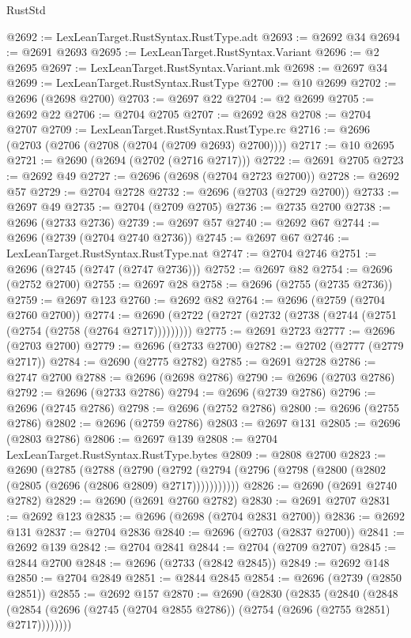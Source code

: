 \begin{lexlean}{RustStd}
\begin{coremodule}
@2692 := LexLeanTarget.RustSyntax.RustType.adt
@2693 := @2692 @34
@2694 := @2691 @2693
@2695 := LexLeanTarget.RustSyntax.Variant
@2696 := @2 @2695
@2697 := LexLeanTarget.RustSyntax.Variant.mk
@2698 := @2697 @34
@2699 := LexLeanTarget.RustSyntax.RustType
@2700 := @10 @2699
@2702 := @2696 (@2698 @2700)
@2703 := @2697 @22
@2704 := @2 @2699
@2705 := @2692 @22
@2706 := @2704 @2705
@2707 := @2692 @28
@2708 := @2704 @2707
@2709 := LexLeanTarget.RustSyntax.RustType.rc
@2716 := @2696 (@2703 (@2706 (@2708 (@2704 (@2709 @2693) @2700))))
@2717 := @10 @2695
@2721 := @2690 (@2694 (@2702 (@2716 @2717)))
@2722 := @2691 @2705
@2723 := @2692 @49
@2727 := @2696 (@2698 (@2704 @2723 @2700))
@2728 := @2692 @57
@2729 := @2704 @2728
@2732 := @2696 (@2703 (@2729 @2700))
@2733 := @2697 @49
@2735 := @2704 (@2709 @2705)
@2736 := @2735 @2700
@2738 := @2696 (@2733 @2736)
@2739 := @2697 @57
@2740 := @2692 @67
@2744 := @2696 (@2739 (@2704 @2740 @2736))
@2745 := @2697 @67
@2746 := LexLeanTarget.RustSyntax.RustType.nat
@2747 := @2704 @2746
@2751 := @2696 (@2745 (@2747 (@2747 @2736)))
@2752 := @2697 @82
@2754 := @2696 (@2752 @2700)
@2755 := @2697 @28
@2758 := @2696 (@2755 (@2735 @2736))
@2759 := @2697 @123
@2760 := @2692 @82
@2764 := @2696 (@2759 (@2704 @2760 @2700))
@2774 := @2690 (@2722 (@2727 (@2732 (@2738 (@2744 (@2751 (@2754 (@2758 (@2764 @2717)))))))))
@2775 := @2691 @2723
@2777 := @2696 (@2703 @2700)
@2779 := @2696 (@2733 @2700)
@2782 := @2702 (@2777 (@2779 @2717))
@2784 := @2690 (@2775 @2782)
@2785 := @2691 @2728
@2786 := @2747 @2700
@2788 := @2696 (@2698 @2786)
@2790 := @2696 (@2703 @2786)
@2792 := @2696 (@2733 @2786)
@2794 := @2696 (@2739 @2786)
@2796 := @2696 (@2745 @2786)
@2798 := @2696 (@2752 @2786)
@2800 := @2696 (@2755 @2786)
@2802 := @2696 (@2759 @2786)
@2803 := @2697 @131
@2805 := @2696 (@2803 @2786)
@2806 := @2697 @139
@2808 := @2704 LexLeanTarget.RustSyntax.RustType.bytes
@2809 := @2808 @2700
@2823 := @2690
    (@2785
      (@2788
        (@2790
          (@2792 (@2794 (@2796 (@2798 (@2800 (@2802 (@2805 (@2696 (@2806 @2809) @2717)))))))))))
@2826 := @2690 (@2691 @2740 @2782)
@2829 := @2690 (@2691 @2760 @2782)
@2830 := @2691 @2707
@2831 := @2692 @123
@2835 := @2696 (@2698 (@2704 @2831 @2700))
@2836 := @2692 @131
@2837 := @2704 @2836
@2840 := @2696 (@2703 (@2837 @2700))
@2841 := @2692 @139
@2842 := @2704 @2841
@2844 := @2704 (@2709 @2707)
@2845 := @2844 @2700
@2848 := @2696 (@2733 (@2842 @2845))
@2849 := @2692 @148
@2850 := @2704 @2849
@2851 := @2844 @2845
@2854 := @2696 (@2739 (@2850 @2851))
@2855 := @2692 @157
@2870 := @2690
    (@2830
      (@2835
        (@2840
          (@2848 (@2854 (@2696 (@2745 (@2704 @2855 @2786)) (@2754 (@2696 (@2755 @2851) @2717))))))))

\end{coremodule}
\end{lexlean}
